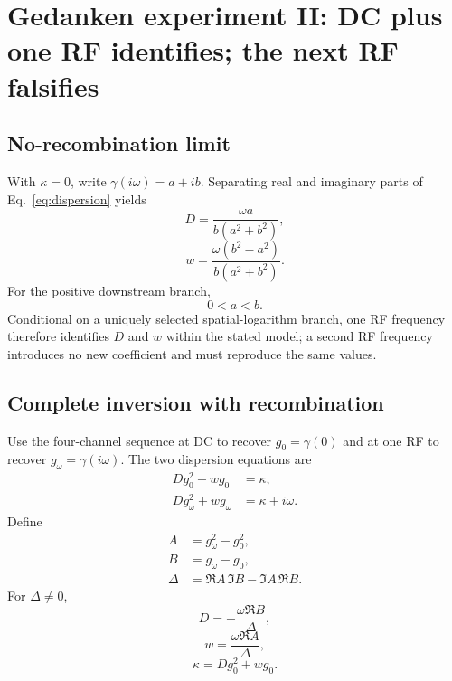 \documentclass[11pt]{article}
\begin{document}
\section{Gedanken experiment II: DC plus one RF identifies; the next RF falsifies}

\subsection{No-recombination limit}

With $\kappa=0$, write $\gamma(i\omega)=a+ib$. Separating real and imaginary parts of Eq.~\eqref{eq:dispersion} yields
\begin{equation}
\boxed{D=\frac{\omega a}{b(a^2+b^2)},}
\label{eq:Dsimple}
\end{equation}
\begin{equation}
\boxed{w=\frac{\omega(b^2-a^2)}{b(a^2+b^2)}.}
\label{eq:wsimple}
\end{equation}
For the positive downstream branch,
\begin{equation}
\boxed{0<a<b.}
\end{equation}
Conditional on a uniquely selected spatial-logarithm branch, one RF frequency therefore identifies $D$ and $w$ within the stated model; a second RF frequency introduces no new coefficient and must reproduce the same values.

\subsection{Complete inversion with recombination}

Use the four-channel sequence at DC to recover $g_0=\gamma(0)$ and at one RF to recover $g_\omega=\gamma(i\omega)$. The two dispersion equations are
\begin{align}
Dg_0^2+wg_0&=\kappa,\\
Dg_\omega^2+wg_\omega&=\kappa+i\omega.
\end{align}
Define
\begin{align}
A&=g_\omega^2-g_0^2,\\
B&=g_\omega-g_0,\\
\Delta&=\Re A\,\Im B-\Im A\,\Re B.
\end{align}
For $\Delta\neq0$,
\begin{equation}
\boxed{D=-\frac{\omega\Re B}{\Delta},}
\label{eq:Drecomb}
\end{equation}
\begin{equation}
\boxed{w=\frac{\omega\Re A}{\Delta},}
\label{eq:wrecomb}
\end{equation}
\begin{equation}
\boxed{\kappa=Dg_0^2+wg_0.}
\label{eq:krecomb}
\end{equation}
\end{document}
